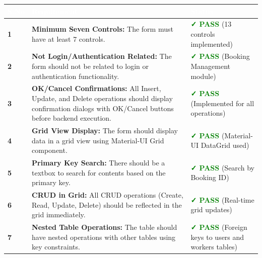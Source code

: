 \documentclass[12pt,a4paper]{article}
\begin{document}
\begin{table}[H]
\centering
\renewcommand{\arraystretch}{2.2}
\begin{tabularx}{\textwidth}{|p{1cm}|p{10cm}|p{2cm}|}
\hline
\rowcolor{headerblue}
\textcolor{white}{\textbf{S.No}} & \textcolor{white}{\textbf{Requirement}} & \textcolor{white}{\textbf{Status}} \\
\hline

\rowcolor{lightgray}
\textbf{1} & \textbf{Minimum Seven Controls:} The form must have at least 7 controls. & \textcolor{green}{\textbf{✓ PASS}} \newline (13 controls implemented) \\
\hline

\textbf{2} & \textbf{Not Login/Authentication Related:} The form should not be related to login or authentication functionality. & \textcolor{green}{\textbf{✓ PASS}} \newline (Booking Management module) \\
\hline

\rowcolor{lightgray}
\textbf{3} & \textbf{OK/Cancel Confirmations:} All Insert, Update, and Delete operations should display confirmation dialogs with OK/Cancel buttons before backend execution. & \textcolor{green}{\textbf{✓ PASS}} \newline (Implemented for all operations) \\
\hline

\textbf{4} & \textbf{Grid View Display:} The form should display data in a grid view using Material-UI Grid component. & \textcolor{green}{\textbf{✓ PASS}} \newline (Material-UI DataGrid used) \\
\hline

\rowcolor{lightgray}
\textbf{5} & \textbf{Primary Key Search:} There should be a textbox to search for contents based on the primary key. & \textcolor{green}{\textbf{✓ PASS}} \newline (Search by Booking ID) \\
\hline

\textbf{6} & \textbf{CRUD in Grid:} All CRUD operations (Create, Read, Update, Delete) should be reflected in the grid immediately. & \textcolor{green}{\textbf{✓ PASS}} \newline (Real-time grid updates) \\
\hline

\rowcolor{lightgray}
\textbf{7} & \textbf{Nested Table Operations:} The table should have nested operations with other tables using key constraints. & \textcolor{green}{\textbf{✓ PASS}} \newline (Foreign keys to users and workers tables) \\
\hline
\end{tabularx}
\end{table}
\end{document}
